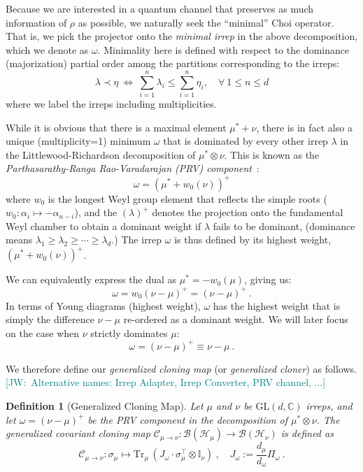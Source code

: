 \documentclass[a4paper,onecolumn,11pt]{quantumarticle}
\newtheorem{defn}{Definition}
\def\id{\mathbb{I}}
\newcommand*{\Tr}{\mathrm{Tr}}
\newcommand{\JW}[1]{\textcolor{teal}{[JW:\ #1]}}
\begin{document}
Because we are interested in a quantum channel that preserves as much information of $\rho$ as possible, we naturally seek the ``minimal'' Choi operator. That is, we pick the projector onto the \emph{minimal irrep} in the above decomposition, which we denote as $\omega$. Minimality here is defined with respect to the dominance (majorization) partial order among the partitions corresponding to the irreps:
\begin{equation}\label{eq:dominance}
    \lambda\prec\eta\ \iff\  \sum_{i=1}^n \lambda_i\le \sum_{i=1}^n\eta_i,\quad\forall\ 1\le n\le d
\end{equation}
where we label the irreps including multiplicities.

While it is obvious that there is a maximal element $\mu^*+\nu$, there is in fact also a unique (multiplicity=1) minimum $\omega$ that is dominated by every other irrep $\lambda$ in the Littlewood-Richardson decomposition of $\mu^*\otimes\nu$. This is known as the \emph{Parthasarathy-Ranga Rao-Varadarajan (PRV) component}~\cite{parthasarathy1967,kumar1988proof}:
\begin{equation}
    \omega = (\mu^*+w_0(\nu))^+
\end{equation}
where $w_0$ is the longest Weyl group element that reflects the simple roots ($w_0:\alpha_i\mapsto -\alpha_{n-i}$), and the $(\lambda)^+$  denotes the projection onto the fundamental Weyl chamber to obtain a dominant weight if $\lambda$ fails to be dominant, (dominance means $\lambda_1\ge\lambda_2\ge\cdots\ge\lambda_d$.) The irrep $\omega$ is thus defined by its highest weight, $(\mu^*+w_0(\nu))^+$.

We can equivalently express the dual as $\mu^* = - w_0(\mu)$, giving us:
\begin{equation}
    \omega = w_0(\nu-\mu)^+ = (\nu-\mu)^+\ .
\end{equation}
In terms of Young diagrams (highest weight), $\omega$ has the highest weight that is simply the difference $\nu-\mu$ re-ordered as a dominant weight. We will later focus on the case when $\nu$ strictly dominates $\mu$: $$\omega =(\nu-\mu)^+\equiv\nu-\mu\ .$$

We therefore define our \emph{generalized cloning map} (or \emph{generalized cloner}) as follows.\JW{Alternative names: Irrep Adapter, Irrep Converter, PRV channel, ...}

\begin{defn}[Generalized Cloning Map]
Let $\mu$ and $\nu$ be $\mathrm{GL}(d,\mathbb{C})$ irreps, and let $\omega = (\nu-\mu)^+$ be the PRV component in the decomposition of $\mu^*\otimes\nu$. The generalized covariant cloning map $\mathcal{C}_{\mu\to\nu}:\mathcal B(\mathcal{H}_\mu)\to \mathcal B(\mathcal{H}_\nu)$ is defined as
\begin{equation}\label{eq:gen_cloner}
    \mathcal{C}_{\mu\to\nu}: \sigma_\mu\mapsto \Tr_\mu\,\left(J_\omega\cdot\sigma_\mu^\top\otimes \id_\nu\right)\ ,\quad J_\omega:=\frac{d_\mu}{d_\omega} \Pi_{\omega}\ .
\end{equation}
\end{defn}
\end{document}
